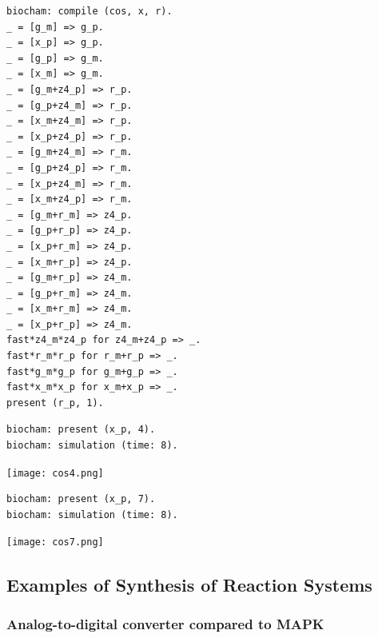 \documentclass[graybox]{svmult}
\begin{document}
\noindent
\begin{minipage} [t]{5.5cm}
{\scriptsize
\begin{verbatim}
biocham: compile (cos, x, r).
_ = [g_m] => g_p.
_ = [x_p] => g_p.
_ = [g_p] => g_m.
_ = [x_m] => g_m.
_ = [g_m+z4_p] => r_p.
_ = [g_p+z4_m] => r_p.
_ = [x_m+z4_m] => r_p.
_ = [x_p+z4_p] => r_p.
_ = [g_m+z4_m] => r_m.
_ = [g_p+z4_p] => r_m.
_ = [x_p+z4_m] => r_m.
_ = [x_m+z4_p] => r_m.
_ = [g_m+r_m] => z4_p.
_ = [g_p+r_p] => z4_p.
_ = [x_p+r_m] => z4_p.
_ = [x_m+r_p] => z4_p.
_ = [g_m+r_p] => z4_m.
_ = [g_p+r_m] => z4_m.
_ = [x_m+r_m] => z4_m.
_ = [x_p+r_p] => z4_m.
fast*z4_m*z4_p for z4_m+z4_p => _.
fast*r_m*r_p for r_m+r_p => _.
fast*g_m*g_p for g_m+g_p => _.
fast*x_m*x_p for x_m+x_p => _.
present (r_p, 1).
\end{verbatim}
}
\end{minipage}
\begin{minipage} [t]{7cm}
{\scriptsize \begin{verbatim}
biocham: present (x_p, 4).
biocham: simulation (time: 8).
\end{verbatim}
}
\texttt{[image: cos4.png]}
{\scriptsize \begin{verbatim}
biocham: present (x_p, 7).
biocham: simulation (time: 8).
\end{verbatim}
}
\texttt{[image: cos7.png]}
\end{minipage}

\subsection{Examples of Synthesis of Reaction Systems}

\subsubsection{Analog-to-digital converter compared to MAPK}
\end{document}

